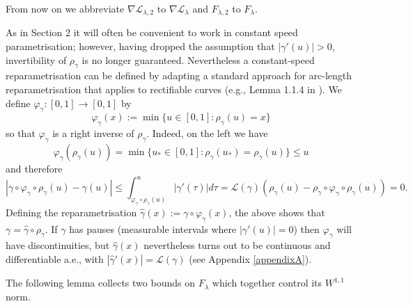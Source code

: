 \documentclass[a4paper,11pt]{amsart}
\theoremstyle{definition}\newtheorem*{definition}{Definition}
\theoremstyle{definition} \newtheorem{proposition}[theorem]{Proposition}
\theoremstyle{definition}\newtheorem{lemma}[theorem]{Lemma}
\theoremstyle{definition}\newtheorem{corollary}[theorem]{Corollary}
\theoremstyle{definition}\newtheorem{example}{Example}
\theoremstyle{remark}\newtheorem*{remark}{Remark}
\newcommand{\abs}[1]{\left | {#1}\right |}
\def\length{\mathcal L}
\begin{document}
From now on we abbreviate $\nabla\length_{\lambda,2}$ to $\nabla\length_{\lambda}$ and $F_{\lambda,2}$ to $F_\lambda$. 

As in Section 2 it will often be convenient to work in constant speed parametrisation; however, having dropped the assumption that $|\gamma'(u)|>0$, invertibility of $\rho_\gamma$ is no longer guaranteed. 
Nevertheless a constant-speed reparametrisation can be defined by adapting a standard approach for arc-length reparametrisation that applies to rectifiable curves (e.g., Lemma 1.1.4 in \cite{AmbrosioGigliSavare2008}). 
We define $\varphi_\gamma:[0,1]\to[0,1]$ by 
\[
\varphi_\gamma(x):=\min\{u\in [0,1]:\rho_\gamma(u)=x\}
\]
so that $\varphi_\gamma$ is a right inverse of $\rho_\gamma$. 
Indeed, on the left we have 
\[ 
\varphi_\gamma(\rho_\gamma(u))=\min\{u_*\in[0,1]:\rho_\gamma(u_*)=\rho_\gamma(u)\}\leq u
\]
and therefore 
\begin{equation*}
\abs{\gamma\circ \varphi_\gamma\circ\rho_\gamma(u)-\gamma(u)}\leq \int_{\varphi_\gamma\circ\rho_\gamma(u)}^u \abs{\gamma'(\tau)}d\tau=\length(\gamma)(\rho_\gamma(u)-\rho_\gamma\circ\varphi_\gamma\circ\rho_\gamma(u))=0.
\end{equation*}
Defining the reparametrisation $\hat\gamma(x):=\gamma\circ\varphi_\gamma(x)$, the above shows that $\gamma=\hat\gamma\circ \rho_\gamma$. If $\gamma$ has pauses (measurable intervals where $|\gamma'(u)|=0$) then $\varphi_\gamma$ will have discontinuities, but $\hat\gamma(x)$ nevertheless turns out to be continuous and differentiable a.e., with $|\hat \gamma'(x)|=\length(\gamma)$ (see Appendix \ref{appendixA}). 

The following lemma collects two bounds on $F_\lambda$ which together control its $W^{1,1}$ norm. 
\end{document}

